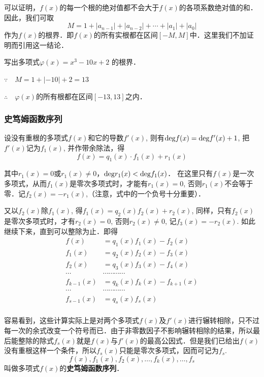 可以证明，$f(x)$的每一个根的绝对值都不会大于$f(x)$的各项系数绝对值的和．因此，我们可取
\[M=1+|a_{n-1}|+|a_{n-2}|+\cdots+|a_1|+|a_0|\]
作为$f(x)$的根界．即$f(x)$的所有实根都在区间$[-M,M]$中．这里我们不加证明而引用这一结论．

\begin{example}
    写出多项式$\varphi(x)=x^3-10x+2$ 的根界．
\end{example}

\begin{solution}
 $\because\quad    M=1+|-10|+2=13$
 
 $\therefore\quad \varphi(x)$的所有根都在区间$[-13, 13]$之内．
\end{solution}

\subsubsection{史笃姆函数序列}
设没有重根的多项式$f(x)$和它的导数$f'(x)$, 则有${\rm deg}f(x)={\rm deg}f'(x)+1$, 把$f'(x)$记为$f_1(x)$, 并作带余除法，得
\[f (x) =q_1 (x)\cdot f_1(x)+r_1(x)\]

其中$r_1(x)=0$或$r_1(x)\ne 0$，${\rm deg}r_1(x)<{\rm deg}f_1(x)$．
在这里只有$f(x)$是一次多项式，从而$f_1(x)$是零次多项式时，才能有$r_1(x)=0$, 否则$r_1(x)$不会等于零．记$f_2(x)=-r_1(x)$,（注意，式中的一个负号十分重要）．

又以$f_2(x)$除$f_1(x)$, 得$f_1(x)=q_2(x)f_2(x)+r_2(x)$, 同样，只有$f_2(x)$是零次多项式时，才有$r_2(x)=0$, 否则$r_2(x)\ne 0$, 记$f_3(x)=-r_2(x)$. 如此继续下来，直到可以整除为止．即得
\[\begin{split}
    f(x)&=q_1(x)f_1(x)-f_2(x)\\
    f_1(x)&=q_2(x)f_2(x)-f_3(x)\\
    f_2(x)&=q_3(x)f_3(x)-f_4(x)\\
    \cdots &\cdots \cdots \cdots \cdots \\
    f_{k-1}(x)&=q_k(x)f_k(x)-f_{k+1}(x)\\
    \cdots &\cdots \cdots \cdots \cdots \\
    f_{s-1}(x)&=q_s(x)f_s(x)\\
\end{split}\]

容易看到，这些计算实际上是对两个多项式$f(x)$及$f'(x)$进行辗转相除，只不过每一次的余式改变一个符号而已．由于非零数因子不影响辗转相除的结果，所以最后能整除的除式$f_s(x)$就是$f(x)$与$f'(x)$的最高公因式．但是我们已给出$f(x)$没有重根这样一个条件，所以$f_s(x)$只能是零次多项式，因而可记为$f_s$.
\[f (x) ,f_1 (x) ,f_2 (x),\ldots,f_k(x),\ldots,f_s\]
叫做多项式$f(x)$的\textbf{史笃姆函数序列}．


